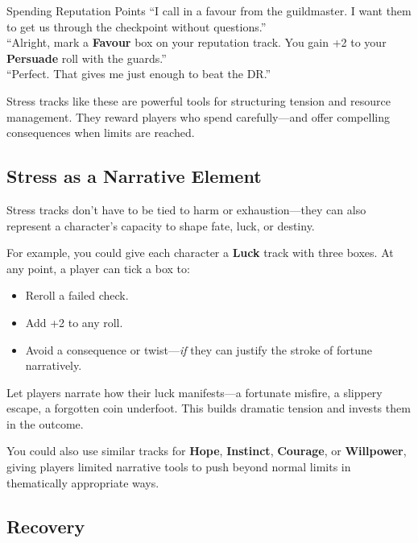 \begin{ExampleGame}{Spending Reputation Points}
    \line[Player] “I call in a favour from the guildmaster. I want them to get us through the checkpoint without questions.” \\
    \line[GM]     “Alright, mark a \textbf{Favour} box on your reputation track. You gain +2 to your \textbf{Persuade} roll with the guards.” \\
    \line[Player] “Perfect. That gives me just enough to beat the DR.”
\end{ExampleGame}

Stress tracks like these are powerful tools for structuring tension and resource management. They reward players who spend carefully—and offer compelling consequences when limits are reached.

\subsection{Stress as a Narrative Element}

Stress tracks don’t have to be tied to harm or exhaustion—they can also represent a character’s capacity to shape fate, luck, or destiny.

For example, you could give each character a \textbf{Luck} track with three boxes. At any point, a player can tick a box to:
\begin{itemize}
    \item Reroll a failed check.
    \item Add +2 to any roll.
    \item Avoid a consequence or twist—\emph{if} they can justify the stroke of fortune narratively.
\end{itemize}

\begin{GmTips}
    Let players narrate how their luck manifests—a fortunate misfire, a slippery escape, a forgotten coin underfoot. This builds dramatic tension and invests them in the outcome.
\end{GmTips}

You could also use similar tracks for \textbf{Hope}, \textbf{Instinct}, \textbf{Courage}, or \textbf{Willpower}, giving players limited narrative tools to push beyond normal limits in thematically appropriate ways.

\subsection{Recovery}

